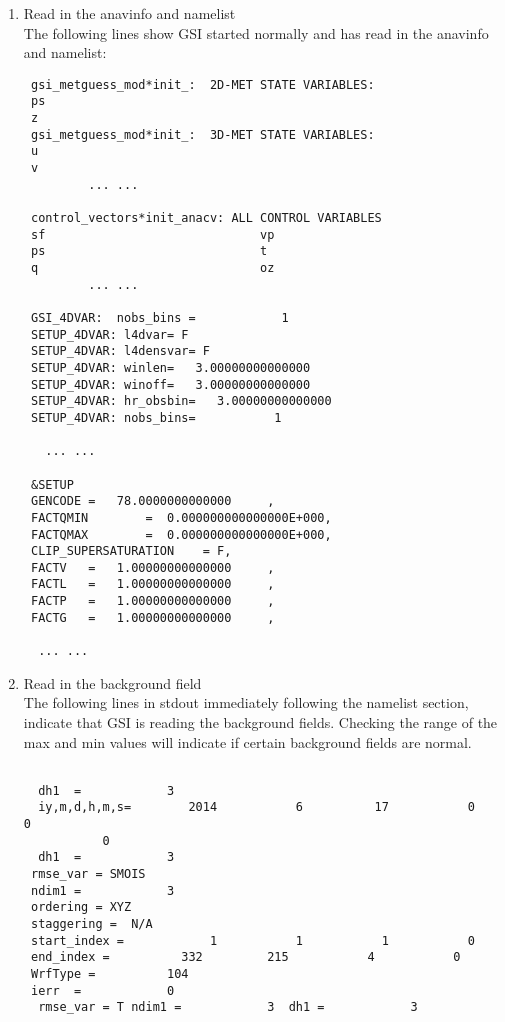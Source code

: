 \begin{enumerate}
\item Read in the anavinfo and namelist \\

The following lines show GSI started normally and has read in the anavinfo and namelist:
\begin{scriptsize}
\begin{verbatim}
 gsi_metguess_mod*init_:  2D-MET STATE VARIABLES:
 ps
 z
 gsi_metguess_mod*init_:  3D-MET STATE VARIABLES:
 u
 v
         ... ... 
         
 control_vectors*init_anacv: ALL CONTROL VARIABLES
 sf                              vp
 ps                              t
 q                               oz
         ... ...
         
 GSI_4DVAR:  nobs_bins =            1
 SETUP_4DVAR: l4dvar= F
 SETUP_4DVAR: l4densvar= F
 SETUP_4DVAR: winlen=   3.00000000000000
 SETUP_4DVAR: winoff=   3.00000000000000
 SETUP_4DVAR: hr_obsbin=   3.00000000000000
 SETUP_4DVAR: nobs_bins=           1

   ... ...
   
 &SETUP
 GENCODE =   78.0000000000000     ,
 FACTQMIN        =  0.000000000000000E+000,
 FACTQMAX        =  0.000000000000000E+000,
 CLIP_SUPERSATURATION    = F,
 FACTV   =   1.00000000000000     ,
 FACTL   =   1.00000000000000     ,
 FACTP   =   1.00000000000000     ,
 FACTG   =   1.00000000000000     ,

  ... ... 
\end{verbatim}
\end{scriptsize}
\item Read in the background field\\

The following lines in stdout immediately following the namelist section, indicate that GSI is reading the background fields.  Checking the range of the max and min values will indicate if certain background fields are normal. 

\begin{scriptsize}
\begin{verbatim}

  dh1  =            3
  iy,m,d,h,m,s=        2014           6          17           0           0
           0
  dh1  =            3
 rmse_var = SMOIS
 ndim1 =            3
 ordering = XYZ
 staggering =  N/A
 start_index =            1           1           1           0
 end_index =          332         215           4           0
 WrfType =          104
 ierr  =            0
  rmse_var = T ndim1 =            3  dh1 =            3


\end{verbatim}
\end{scriptsize}
\end{enumerate}

